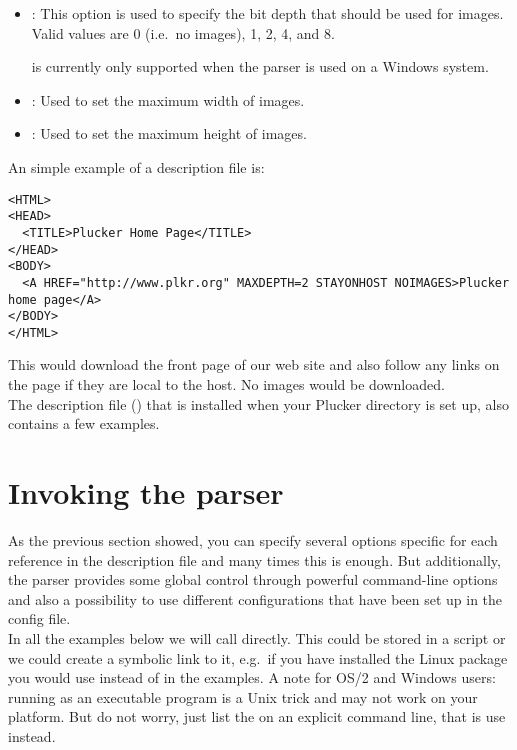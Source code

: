 \begin{itemize}
 \item {}: This option is used to specify
 the bit depth that should be used for images. Valid values are 0 (i.e.\
 no images), 1, 2, 4, and 8.

 \note{}  is currently only supported when the parser is used
 on a Windows system.

 \item {}: Used to set the maximum
 width of images.

 \item {}: Used to set the maximum
 height of images.

\end{itemize}

An simple example of a description file is:

\begin{verbatim}
<HTML>
<HEAD>
  <TITLE>Plucker Home Page</TITLE>
</HEAD>
<BODY>
  <A HREF="http://www.plkr.org" MAXDEPTH=2 STAYONHOST NOIMAGES>Plucker home page</A>
</BODY>
</HTML>
\end{verbatim}

This would download the front page of our web site and also follow any
links on the page if they are local to the host. No images would be
downloaded.\\

The description file () that is installed when your
Plucker directory is set up, also contains a few examples.\\

\section{Invoking the parser}

As the previous section showed, you can specify several options specific
for each reference in the description file and many times this is enough.
But additionally, the parser provides some global control through
powerful command-line options and also a possibility to use different
configurations that have been set up in the config file.\\

In all the examples below we will call  directly. This
could be stored in a script or we could create a symbolic link to it,
e.g.\ if you have installed the Linux package you would use 
instead of  in the examples. A note for OS/2 and Windows
users: running  as an executable program is a Unix trick
and may not work on your platform. But do not worry, just list the
\name{Spider.py} on an explicit \name{python} command line, that is use
\code{python Spider.py \ldots} instead. 

